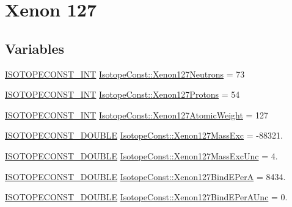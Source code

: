 \hypertarget{group___isotope_const-_xenon-_xe127}{}\section{Xenon 127}
\label{group___isotope_const-_xenon-_xe127}
\subsection*{Variables}
\begin{DoxyCompactItemize}
\item 
\mbox{\hyperlink{group___isotope_const-_macros_ga5f18360b3e99483a35c32d789e62621c}{I\+S\+O\+T\+O\+P\+E\+C\+O\+N\+S\+T\+\_\+\+I\+NT}} \mbox{\hyperlink{group___isotope_const-_xenon-_xe127_gaac12a4b6c26128ddf1be9584f68dd540}{Isotope\+Const\+::\+Xenon127\+Neutrons}} = 73
\item 
\mbox{\hyperlink{group___isotope_const-_macros_ga5f18360b3e99483a35c32d789e62621c}{I\+S\+O\+T\+O\+P\+E\+C\+O\+N\+S\+T\+\_\+\+I\+NT}} \mbox{\hyperlink{group___isotope_const-_xenon-_xe127_ga64d219780d5b7b4f2973bfa3cde0aac0}{Isotope\+Const\+::\+Xenon127\+Protons}} = 54
\item 
\mbox{\hyperlink{group___isotope_const-_macros_ga5f18360b3e99483a35c32d789e62621c}{I\+S\+O\+T\+O\+P\+E\+C\+O\+N\+S\+T\+\_\+\+I\+NT}} \mbox{\hyperlink{group___isotope_const-_xenon-_xe127_gaa6476cc6d83dad94252721101f1ec184}{Isotope\+Const\+::\+Xenon127\+Atomic\+Weight}} = 127
\item 
\mbox{\hyperlink{group___isotope_const-_macros_ga8f45a7272ce02c0b4c65c44636ed719a}{I\+S\+O\+T\+O\+P\+E\+C\+O\+N\+S\+T\+\_\+\+D\+O\+U\+B\+LE}} \mbox{\hyperlink{group___isotope_const-_xenon-_xe127_ga29d6fa837ee480be98c44093702b10e2}{Isotope\+Const\+::\+Xenon127\+Mass\+Exc}} = -\/88321.
\item 
\mbox{\hyperlink{group___isotope_const-_macros_ga8f45a7272ce02c0b4c65c44636ed719a}{I\+S\+O\+T\+O\+P\+E\+C\+O\+N\+S\+T\+\_\+\+D\+O\+U\+B\+LE}} \mbox{\hyperlink{group___isotope_const-_xenon-_xe127_gab3b735c8d01f4b8477f5801725c14d79}{Isotope\+Const\+::\+Xenon127\+Mass\+Exc\+Unc}} = 4.
\item 
\mbox{\hyperlink{group___isotope_const-_macros_ga8f45a7272ce02c0b4c65c44636ed719a}{I\+S\+O\+T\+O\+P\+E\+C\+O\+N\+S\+T\+\_\+\+D\+O\+U\+B\+LE}} \mbox{\hyperlink{group___isotope_const-_xenon-_xe127_ga8acc493b3a0a4b826a310e1b2a5638eb}{Isotope\+Const\+::\+Xenon127\+Bind\+E\+PerA}} = 8434.
\item 
\mbox{\hyperlink{group___isotope_const-_macros_ga8f45a7272ce02c0b4c65c44636ed719a}{I\+S\+O\+T\+O\+P\+E\+C\+O\+N\+S\+T\+\_\+\+D\+O\+U\+B\+LE}} \mbox{\hyperlink{group___isotope_const-_xenon-_xe127_gace9015be3bd166a606aec2f107995b57}{Isotope\+Const\+::\+Xenon127\+Bind\+E\+Per\+A\+Unc}} = 0.

\end{DoxyCompactItemize}
